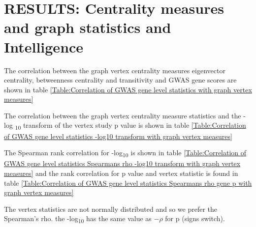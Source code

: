  








\section{RESULTS: Centrality measures and graph statistics and Intelligence}

The correlation between the graph vertex centrality measures eigenvector centrality, betweenness centrality and transitivity and GWAS gene scores are shown in table \ref{Table:Correlation of GWAS gene level statistics with graph vertex measures}

The correlation between the graph vertex centrality measure statistics and the -log \textsubscript{10} transform of the vertex study p value is shown in table \ref{Table:Correlation of GWAS gene level statistics -log10 transform with graph vertex measures}

The Spearman rank correlation for -log\textsubscript{10} is shown in table \ref{Table:Correlation of GWAS gene level statistics Spearmans rho -log10 transform with graph vertex measures} and the rank correlation for p value and vertex statistic is found in table \ref{Table:Correlation of GWAS gene level statistics Spearmans rho gene p  with graph vertex measures} 

The vertex statistics are not normally distributed  and so we prefer the Spearman's rho. the -log\textsubscript{10} has the same value as $-\rho$ for p (signs switch).




